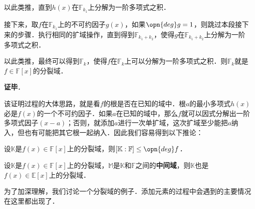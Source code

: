 以此类推，直到$h(x)$在$\mathbb{F}_{k_1}$上分解为一阶多项式之积．

接下来，取$f$在$\mathbb{F}_{k_1}$上的不可约因子$g(x)$，如果$\opn{deg} g = 1$，则跳过本段接下来的步骤．执行相同的扩域操作，直到得到$\mathbb{F}_{k_1+k_2}$，使得$g$在$\mathbb{F}_{k_1+k_2}$上分解为一阶多项式之积．

以此类推，最终可以得到$\mathbb{F}_k$，使得$f$在$\mathbb{F}_k$上可以分解为一阶多项式之积．则$\mathbb{F}_k$就是$f\in\mathbb{F}[x]$的分裂域．

\textbf{证毕}．

该证明过程的大体思路，就是看$f$的根是否在已知的域中．根$a$的最小多项式$h(x)$必是$f(x)$的一个不可约因子．如果$a$在已知的域中，那么$f$就可以因式分解出一阶多项式因子$(x-a)$；否则，就添加$a$进行一次单扩域，这次扩域至少能把$a$纳入，但也有可能把其它根一起纳入．因此我们容易得到以下推论：

\begin{corollary}{}
设$\mathbb{K}$是$f(x)\in \mathbb{F}[x]$上的分裂域，则$[\mathbb{K}:\mathbb{F}]\leq \opn{deg}f$．
\end{corollary}

\begin{corollary}{}
设$\mathbb{K}$是$f(x)\in \mathbb{F}[x]$上的分裂域，$\mathbb{M}$是$\mathbb{K}$和$\mathbb{F}$之间的\textbf{中间域}，则$\mathbb{K}$也是$f(x)\in \mathbb{E}[x]$上的分裂域．
\end{corollary}

为了加深理解，我们讨论一个分裂域的例子．添加元素的过程中会遇到的主要情况在这里都出现了．

